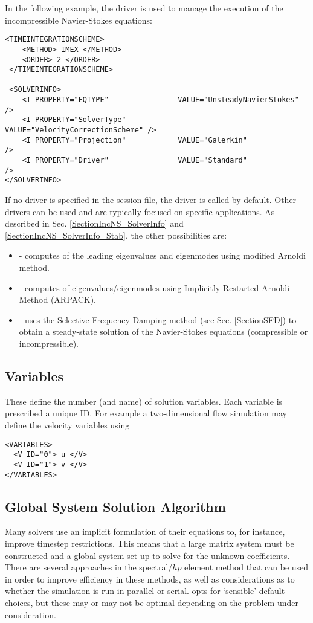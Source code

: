 In the following example, the driver  is used to manage the 
execution of the incompressible Navier-Stokes equations:
\begin{lstlisting}[style=XMLStyle]
 <TIMEINTEGRATIONSCHEME>
    <METHOD> IMEX </METHOD>
    <ORDER> 2 </ORDER>
 </TIMEINTEGRATIONSCHEME>

 <SOLVERINFO>
    <I PROPERTY="EQTYPE"                VALUE="UnsteadyNavierStokes"     />
    <I PROPERTY="SolverType"            VALUE="VelocityCorrectionScheme" />
    <I PROPERTY="Projection"            VALUE="Galerkin"                 />
    <I PROPERTY="Driver"                VALUE="Standard"                 />
</SOLVERINFO>
\end{lstlisting}

If no driver is specified in the session file, the driver  is 
called by default. Other drivers can be used and are typically focused on
specific applications. As described in Sec.
\ref{SectionIncNS_SolverInfo} and  \ref{SectionIncNS_SolverInfo_Stab}, 
the other possibilities are:
\begin{itemize}
\item {}  - computes of the leading eigenvalues and 
eigenmodes using modified Arnoldi method.
\item {} - computes of eigenvalues/eigenmodes using Implicitly 
Restarted Arnoldi Method (ARPACK).
\item {} - uses the Selective Frequency Damping method 
(see Sec. \ref{SectionSFD}) to obtain a steady-state solution of the 
Navier-Stokes equations (compressible or incompressible).
\end{itemize}

\subsection{Variables}

These define the number (and name) of solution variables. Each variable is
prescribed a unique ID. For example a two-dimensional flow simulation may define
the velocity variables using

\begin{lstlisting}[style=XMLStyle]
<VARIABLES>
  <V ID="0"> u </V>
  <V ID="1"> v </V>
</VARIABLES>
\end{lstlisting}

\subsection{Global System Solution Algorithm}
\label{globalsyssoln}
Many \nekpp solvers use an implicit formulation of their equations to, for
instance, improve timestep restrictions. This means that a large matrix system
must be constructed and a global system set up to solve for the unknown
coefficients. There are several approaches in the spectral/$hp$ element method
that can be used in order to improve efficiency in these methods, as well as
considerations as to whether the simulation is run in parallel or serial. \nekpp
opts for `sensible' default choices, but these may or may not be optimal
depending on the problem under consideration.

